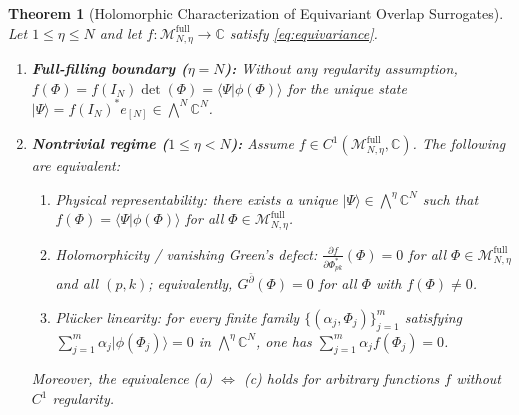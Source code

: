 \documentclass[11pt,a4paper]{article}
\newtheorem{theorem}{Theorem}[section]
\theoremstyle{definition}
\newcommand{\C}{\mathbb{C}}
\newcommand{\ket}[1]{\lvert #1 \rangle}
\newcommand{\braket}[2]{\langle #1 \vert #2 \rangle}
\begin{document}
\begin{theorem}[Holomorphic Characterization of Equivariant Overlap Surrogates]\label{thm:holo}
Let $1 \le \eta \le N$ and let $f : \mathcal{M}_{N,\eta}^{\mathrm{full}} \to \C$ satisfy \eqref{eq:equivariance}.
\begin{enumerate}[label=(\roman*),leftmargin=1.8em]
  \item \textbf{Full-filling boundary ($\eta = N$):} Without any regularity assumption, $f(\Phi) = f(I_N)\det(\Phi) = \braket{\Psi}{\phi(\Phi)}$ for the unique state $\ket{\Psi} = f(I_N)^* e_{[N]} \in \bigwedge^N \C^N$.
  \item \textbf{Nontrivial regime ($1 \le \eta < N$):} Assume $f \in C^1(\mathcal{M}_{N,\eta}^{\mathrm{full}}, \C)$. The following are equivalent:
  \begin{enumerate}[label=(\alph*),leftmargin=1.6em]
    \item \emph{Physical representability:} there exists a unique $\ket{\Psi} \in \bigwedge^\eta \C^N$ such that $f(\Phi) = \braket{\Psi}{\phi(\Phi)}$ for all $\Phi \in \mathcal{M}_{N,\eta}^{\mathrm{full}}$.
    \item \emph{Holomorphicity / vanishing Green's defect:} $\frac{\partial f}{\partial \Phi^*_{pk}}(\Phi) = 0$ for all $\Phi \in \mathcal{M}_{N,\eta}^{\mathrm{full}}$ and all $(p,k)$; equivalently, $G^{\bar{\partial}}(\Phi) = 0$ for all $\Phi$ with $f(\Phi) \neq 0$.
    \item \emph{Pl\"ucker linearity:} for every finite family $\{(\alpha_j, \Phi_j)\}_{j=1}^m$ satisfying $\sum_{j=1}^m \alpha_j \ket{\phi(\Phi_j)} = 0$ in $\bigwedge^\eta \C^N$, one has $\sum_{j=1}^m \alpha_j f(\Phi_j) = 0$.
  \end{enumerate}
  Moreover, the equivalence (a) $\Leftrightarrow$ (c) holds for arbitrary functions $f$ without $C^1$ regularity.
\end{enumerate}
\end{theorem}
\end{document}
